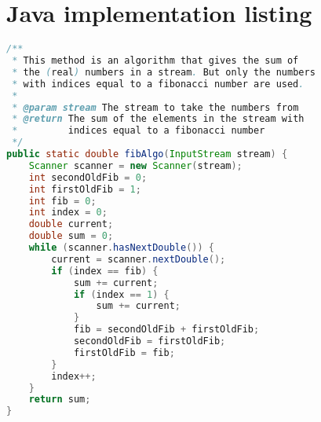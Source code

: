 \documentclass[12pt]{article}
\begin{document}
\appendix

\section{Java implementation listing}

\begin{lstlisting}[language=java]
/**
 * This method is an algorithm that gives the sum of
 * the (real) numbers in a stream. But only the numbers
 * with indices equal to a fibonacci number are used.
 *
 * @param stream The stream to take the numbers from
 * @return The sum of the elements in the stream with
 *         indices equal to a fibonacci number
 */
public static double fibAlgo(InputStream stream) {
    Scanner scanner = new Scanner(stream);
    int secondOldFib = 0;
    int firstOldFib = 1;
    int fib = 0;
    int index = 0;
    double current;
    double sum = 0;
    while (scanner.hasNextDouble()) {
        current = scanner.nextDouble();
        if (index == fib) {
            sum += current;
            if (index == 1) {
                sum += current;
            }
            fib = secondOldFib + firstOldFib;
            secondOldFib = firstOldFib;
            firstOldFib = fib;
        }
        index++;
    }
    return sum;
}
\end{lstlisting}
\end{document}
